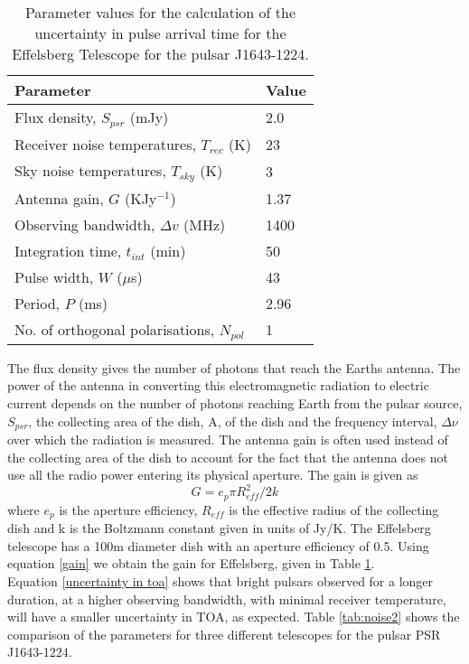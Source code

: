 \documentclass[12pt]{article}
\begin{document}
	\begin{table}[h!]
		\centering
		\begin{tabular}{|l|l|}
			\hline
			\textbf{Parameter} & \textbf{Value} \\\hline
			Flux density, $S_{psr}$ (mJy)& 2.0 \\
			\hline
			Receiver noise temperatures, $T_{rec}$ (K) & 23\\
			\hline
			Sky noise temperatures, $T_{sky}$ (K) & 3\\
			\hline
			Antenna gain, $G$ (K{Jy}$^{-1}$)&1.37\\
			\hline
			Observing bandwidth, $\Delta{v}$ (MHz) & 1400\\
			\hline
			Integration time, $t_{int}$ (min)& 50\\
			\hline
			Pulse width, $W$ ($\mu$s)& 43\\
			\hline
			Period, $P$ (ms) & 2.96\\
			\hline
			No. of orthogonal polarisations, $N_{pol}$&1\\ 	
			\hline
		\end{tabular}
		\caption{\label{tab:noise}Parameter values for the calculation of the uncertainty in pulse arrival time for the Effelsberg Telescope for the pulsar J1643-1224.}
	\end{table} 
	The flux density gives the number of photons that reach the Earths antenna. The power of the antenna in converting this electromagnetic radiation to electric current depends on the number of photons reaching Earth from the pulsar source, $S_{psr}$, the collecting area of the dish, A, of the dish and the frequency interval, $\Delta \nu$ over which the radiation is measured. The antenna gain is often used instead of the collecting area of the dish to account for the fact that the antenna does not use all the radio power entering its physical aperture. The gain is given as
	\begin{equation}\label{gain}
	G=e_p \pi R_{eff}^2/2k
	\end{equation}
	where $e_p$ is the aperture efficiency, $R_{eff}$ is the effective radius of the collecting dish and k is the Boltzmann constant given in units of Jy/K. The Effelsberg telescope has a 100m diameter dish with an aperture efficiency of 0.5. Using equation \ref{gain} we obtain the gain for Effelsberg, given in Table \ref{tab:noise}.\\
	\noindent Equation \ref{uncertainty in toa} shows that bright pulsars observed for a longer duration, at a higher observing bandwidth, with minimal receiver temperature, will have a smaller uncertainty in TOA, as expected. Table \ref{tab:noise2} shows the comparison of the parameters for three different telescopes for the pulsar PSR J1643-1224.\\
\end{document}
